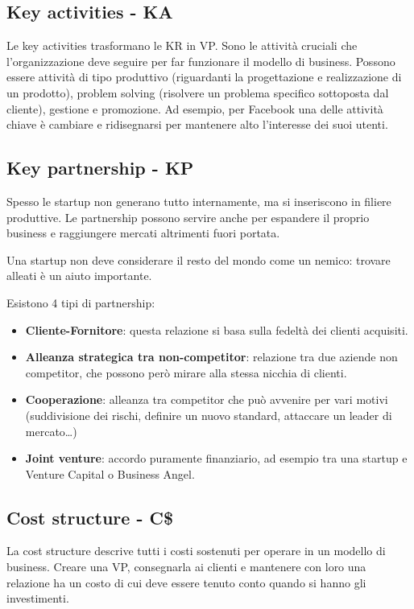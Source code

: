 \subsection{Key activities - KA}

Le key activities trasformano le KR in VP. Sono le attività cruciali che
l'organizzazione deve seguire per far funzionare il modello di business.
Possono essere attività di tipo produttivo (riguardanti la progettazione e
realizzazione di un prodotto), problem solving (risolvere un problema specifico
sottoposta dal cliente), gestione e promozione. Ad esempio, per Facebook una
delle attività chiave è cambiare e ridisegnarsi per mantenere alto l'interesse
dei suoi utenti.

\subsection{Key partnership - KP}

Spesso le startup non generano tutto internamente, ma si inseriscono in filiere
produttive. Le partnership possono servire anche per espandere il proprio
business e raggiungere mercati altrimenti fuori portata.

Una startup non deve considerare il resto del mondo come un nemico: trovare
alleati è un aiuto importante.

Esistono 4 tipi di partnership:

\begin{itemize}
 \item \textbf{Cliente-Fornitore}: questa relazione si basa sulla
fedeltà dei clienti acquisiti.
 \item \textbf{Alleanza strategica tra non-competitor}: relazione
tra due aziende non competitor, che possono però mirare alla stessa
nicchia di clienti.
 \item \textbf{Cooperazione}: alleanza tra competitor che può avvenire
per vari motivi (suddivisione dei rischi, definire un nuovo standard,
attaccare un leader di mercato\dots)
 \item \textbf{Joint venture}: accordo puramente finanziario, ad esempio
tra una startup e Venture Capital o Business Angel.
\end{itemize}

\subsection{Cost structure - C\$}

La cost structure descrive tutti i costi sostenuti per operare in un modello di
business. Creare una VP, consegnarla ai clienti e mantenere con loro una
relazione ha un costo di cui deve essere tenuto conto quando si hanno gli
investimenti.

